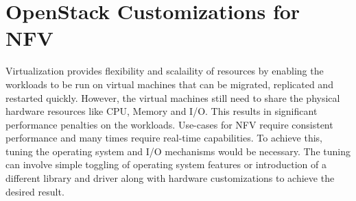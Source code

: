 \section{OpenStack Customizations for NFV}

Virtualization provides flexibility and scalaility of resources by enabling the workloads to be run on virtual machines that can be migrated, replicated and restarted quickly. However, the virtual machines still need to share the physical hardware resources like CPU, Memory and I/O. This results in significant performance penalties on the workloads. Use-cases for NFV require consistent performance and many times require real-time capabilities. To achieve this, tuning the operating system and I/O mechanisms would be necessary. The tuning can involve simple toggling of operating system features or introduction of a different library and driver along with hardware customizations to achieve the desired result.

